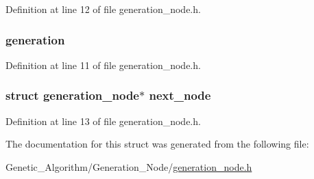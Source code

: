 Definition at line 12 of file generation\+\_\+node.\+h.

\hypertarget{structgeneration__node_a40379d9ada9495936ee4f29d634dde80}{}
\subsubsection[{generation}]{ {\bf generation}}\label{structgeneration__node_a40379d9ada9495936ee4f29d634dde80}


Definition at line 11 of file generation\+\_\+node.\+h.

\hypertarget{structgeneration__node_a1f033b4ab08a9635b6efe700077b656a}{}
\subsubsection[{next\+\_\+node}]{\setlength{\rightskip}{0pt plus 5cm}struct {\bf generation\+\_\+node}$\ast$ next\+\_\+node}\label{structgeneration__node_a1f033b4ab08a9635b6efe700077b656a}


Definition at line 13 of file generation\+\_\+node.\+h.



The documentation for this struct was generated from the following file\+:\begin{DoxyCompactItemize}
\item 
Genetic\+\_\+\+Algorithm/\+Generation\+\_\+\+Node/\hyperlink{generation__node_8h}{generation\+\_\+node.\+h}\end{DoxyCompactItemize}
